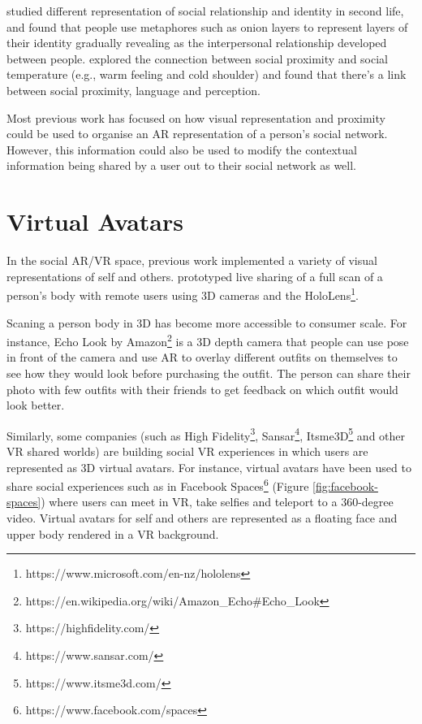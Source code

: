 \textcite{Leshed2012} studied different representation of social relationship and identity in second life, and found that people use metaphores such as onion layers to represent layers of their identity gradually revealing as the interpersonal relationship developed between people. \textcite{Hans2009} explored the connection between social proximity and social temperature (e.g., warm feeling and cold shoulder) and found that there’s a link between social proximity, language and perception. 


Most previous work has focused on how visual representation and proximity could be used to organise an AR representation of a person's social network. However, this information could also be used to modify the contextual information being shared by a user out to their social network as well. 

\section{Virtual Avatars}

In the social AR/VR space, previous work implemented a variety of visual representations of self and others. \textcite{Fanello2016} prototyped live sharing of a full scan of a person's body with remote users using 3D cameras and the HoloLens\footnote{https://www.microsoft.com/en-nz/hololens}. 

Scaning a person body in 3D has become more accessible to consumer scale. For instance, Echo Look by Amazon\footnote{https://en.wikipedia.org/wiki/Amazon_Echo#Echo_Look} is a 3D depth camera that people can use pose in front of the camera and use AR to overlay different outfits on themselves to see how they would look before purchasing the outfit. The person can share their photo with few outfits with their friends to get feedback on which outfit would look better. 

Similarly, some companies (such as High Fidelity\footnote{https://highfidelity.com/}, Sansar\footnote{https://www.sansar.com/}, Itsme3D\footnote{https://www.itsme3d.com/} and other VR shared worlds) are building social VR experiences in which users are represented as 3D virtual avatars. For instance, virtual avatars have been used to share social experiences such as in Facebook Spaces\footnote{https://www.facebook.com/spaces} (Figure \ref{fig:facebook-spaces}) where users can meet in VR, take selfies and teleport to a 360-degree video. Virtual avatars for self and others are represented as a floating face and upper body rendered in a VR background. 

